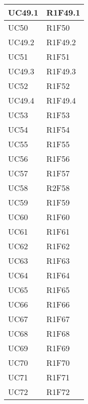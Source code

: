 \begin{center}
\begin{longtable}{|p{44mm}|p{22mm}|}
\hline
UC49.1 &
R1F49.1 
\\
\hline
UC50 &
R1F50 
\\
\hline
UC49.2 &
R1F49.2 
\\
\hline
UC51 &
R1F51 
\\
\hline
UC49.3 &
R1F49.3 
\\
\hline
UC52 &
R1F52 
\\
\hline
UC49.4 &
R1F49.4 
\\
\hline
UC53 &
R1F53 
\\
\hline
UC54 &
R1F54 
\\
\hline
UC55 &
R1F55 
\\
\hline
UC56 &
R1F56 
\\
\hline
UC57 &
R1F57 
\\
\hline
UC58 &
R2F58 
\\
\hline
UC59 &
R1F59 
\\
\hline
UC60 &
R1F60 
\\
\hline
UC61 &
R1F61 
\\
\hline
UC62 &
R1F62 
\\
\hline
UC63 &
R1F63 
\\
\hline
UC64 &
R1F64 
\\
\hline
UC65 &
R1F65 
\\
\hline
UC66 &
R1F66 
\\
\hline
UC67 &
R1F67 
\\
\hline
UC68 &
R1F68 
\\
\hline
UC69 &
R1F69 
\\
\hline
UC70 &
R1F70 
\\
\hline
UC71 &
R1F71 
\\
\hline
UC72 &
R1F72 
\\
\hline%

	\end{longtable}
\end{center}

